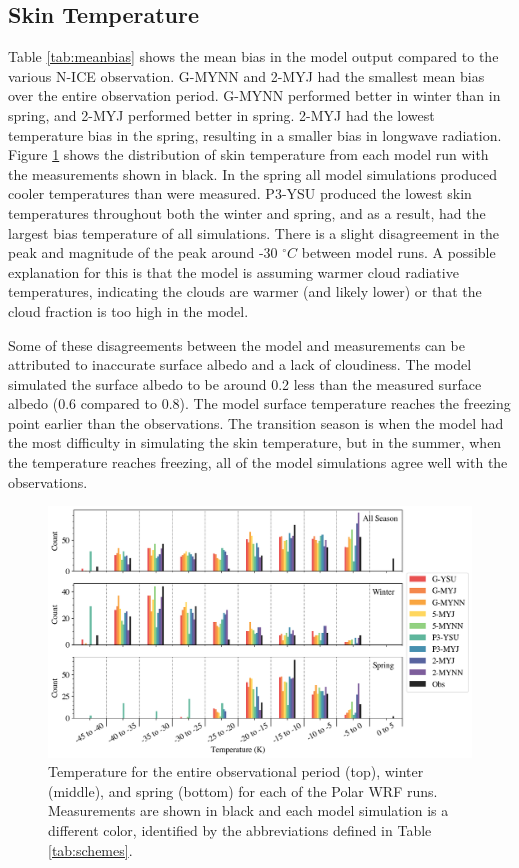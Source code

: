 \subsection{Skin Temperature}
Table \ref{tab:meanbias} shows the mean bias in the model output compared to the various N-ICE observation. G-MYNN and 2-MYJ had the smallest mean bias over the entire observation period. G-MYNN performed better in winter than in spring, and 2-MYJ performed better in spring. 2-MYJ had the lowest temperature bias in the spring, resulting in a smaller bias in longwave radiation. Figure \ref{fig:wrf_tsk} shows the distribution of skin temperature from each model run with the measurements shown in black. In the spring all model simulations produced cooler temperatures than were measured. P3-YSU produced the lowest skin temperatures throughout both the winter and spring, and as a result, had the largest bias temperature of all simulations. There is a slight disagreement in the peak and magnitude of the peak around -30 $^{\circ}C$ between model runs. A possible explanation for this is that the model is assuming warmer cloud radiative temperatures, indicating the clouds are warmer (and likely lower) or that the cloud fraction is too high in the model. 

Some of these disagreements between the model and measurements can be attributed to inaccurate surface albedo and a lack of cloudiness. The model simulated the surface albedo to be around 0.2 less than the measured surface albedo (0.6 compared to 0.8). The model surface temperature reaches the freezing point earlier than the observations. The transition season is when the model had the most difficulty in simulating the skin temperature, but in the summer, when the temperature reaches freezing, all of the model simulations agree well with the observations. 

\begin{figure}[p]
    \centering
    \includegraphics[width=1\linewidth]{figures/chapter3/WRF_TSK_Histo.png}
    \caption[Polar WRF simulated temperature histograms.]{Temperature for the entire observational period (top), winter (middle), and spring (bottom) for each of the Polar WRF runs. Measurements are shown in black and each model simulation is a different color, identified by the abbreviations defined in Table \ref{tab:schemes}.}
    \label{fig:wrf_tsk}
\end{figure}

